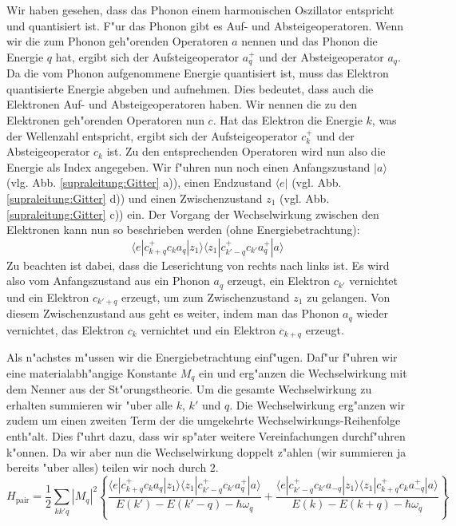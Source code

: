 \begin{refsection}
Wir haben gesehen, dass das Phonon einem harmonischen Oszillator entspricht und quantisiert ist.
F"ur das Phonon gibt es  Auf- und Absteigeoperatoren.
Wenn wir die zum Phonon geh"orenden Operatoren $a$ nennen und das Phonon die Energie $q$ hat,
ergibt sich der Aufsteigeoperator
$a^+_q$ und der Absteigeoperator $a_q$.
Da die vom Phonon aufgenommene Energie quantisiert ist, muss das Elektron quantisierte Energie
abgeben und aufnehmen.
Dies bedeutet, dass auch die Elektronen Auf- und Absteigeoperatoren haben.
Wir nennen die zu den Elektronen geh"orenden Operatoren nun $c$. Hat das Elektron die Energie $k$,
was der Wellenzahl entspricht, ergibt sich der Aufsteigeoperator $c^+_k$ und der
Absteigeoperator $c_k$ ist.
Zu den entsprechenden Operatoren wird nun also die Energie als Index angegeben.
Wir f"uhren nun noch einen Anfangszustand $|a\rangle$ (vlg. Abb. \ref{supraleitung:Gitter} a)),
einen Endzustand $\langle e|$ (vgl. Abb. \ref{supraleitung:Gitter} d)) und
einen Zwischenzustand $z_1$ (vgl. Abb. \ref{supraleitung:Gitter} c)) ein.
Der Vorgang der Wechselwirkung zwischen den Elektronen kann nun so beschrieben werden
(ohne Energiebetrachtung):
\begin{equation}
\langle e|c^+_{k+q} c_k a_q |z_1\rangle\langle z_1| c^+_{k'-q} c_{k'} a^+_q |a\rangle
\label{supraleitung:WechselwirkungOE}
\end{equation}
Zu beachten ist dabei, dass die Leserichtung von rechts nach links ist.
Es wird also vom Anfangszustand aus ein Phonon $a_q$ erzeugt, ein Elektron $c_{k'}$ vernichtet
und ein Elektron $c_{k'+q}$ erzeugt, um zum Zwischenzustand $z_1$ zu gelangen.
Von diesem Zwischenzustand aus geht es weiter, indem man das Phonon $a_q$ wieder vernichtet,
das Elektron $c_k$ vernichtet und ein Elektron $c_{k+q}$ erzeugt.

Als n"achstes m"ussen wir die Energiebetrachtung einf"ugen.
Daf"ur f"uhren wir eine materialabh"angige Konstante $M_q$ ein und erg"anzen die
Wechselwirkung mit dem Nenner aus der St"orungstheorie.
Um die gesamte Wechselwirkung zu erhalten summieren wir "uber alle $k$, $k'$ und $q$.
Die Wechselwirkung erg"anzen wir zudem um einen zweiten Term der die umgekehrte
Wechselwirkungs-Reihenfolge enth"alt.
Dies f"uhrt dazu, dass wir sp"ater weitere Vereinfachungen durchf"uhren k"onnen.
Da wir aber nun die Wechselwirkung doppelt z"ahlen (wir summieren ja bereits "uber alles)
teilen wir noch durch $2$.
\begin{equation}
H_{\text{pair}}=
\frac{1}{2}
\sum \limits_{kk'q} |M_q|^2
\left\{
\frac
{\langle e|c^+_{k+q} c_k a_q |z_1\rangle\langle z_1| c^+_{k'-q} c_{k'} a^+_q |a\rangle }
{E(k')-E(k'-q)-\hbar\omega_q}
+
\frac
{\langle e|c^+_{k'-q} c_{k'} a_{-q}|z_1\rangle\langle z_1| c^+_{k+q} c_k a^+_{-q} |a\rangle }
{E(k)-E(k+q)-\hbar\omega_q}
\right\}
\label{supraleitung:WechselwirkungME}
\end{equation}


\end{refsection}
